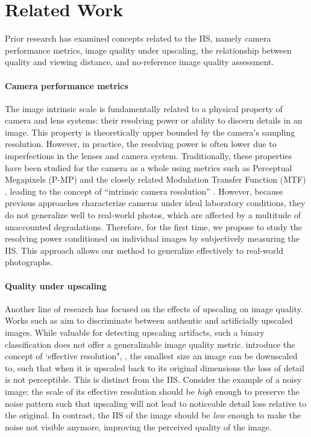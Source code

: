 \section{Related Work}
Prior research has examined concepts related to the IIS, namely camera performance metrics, image quality under upscaling, the relationship between quality and viewing distance, and no-reference image quality assessment.

\paragraph{Camera performance metrics} The image intrinsic scale is fundamentally related to a physical property of camera and lens systems: their resolving power or ability to discern details in an image. This property is theoretically upper bounded by the camera's sampling resolution. However, in practice, the resolving power is often lower due to imperfections in the lenses and camera system. Traditionally, these properties have been studied for the camera as a whole using metrics such as Perceptual Megapixels (P-MP) \cite{dxomark2012perceptual} and the closely related Modulation Transfer Function (MTF) \cite{boreman2001}, leading to the concept of ``intrinsic camera resolution'' \cite{burns2015intrinsic}. However, because previous approaches characterize cameras under ideal laboratory conditions, they do not generalize well to real-world photos, which are affected by a multitude of unaccounted degradations. Therefore, for the first time, we propose to study the resolving power conditioned on individual images by subjectively measuring the IIS. This approach allows our method to generalize effectively to real-world photographs.

\paragraph{Quality under upscaling} Another line of research has focused on the effects of upscaling on image quality.
Works such as \cite{shah2021real, zhu2021perceptual} aim to discriminate between authentic and artificially upscaled images. While valuable for detecting upscaling artifacts, such a binary classification does not offer a generalizable image quality metric.
\citet{kansy2023self} introduce the concept of `effective resolution", \ie, the smallest size an image can be downscaled to, such that when it is upscaled back to its original dimensions the loss of detail is not perceptible.
This is distinct from the IIS. Consider the example of a noisy image: the scale of its effective resolution should be \textit{high} enough to preserve the noise pattern such that upscaling will not lead to noticeable detail loss relative to the original. In contrast, the IIS of the image should be \textit{low} enough to make the noise not visible anymore, improving the perceived quality of the image.

